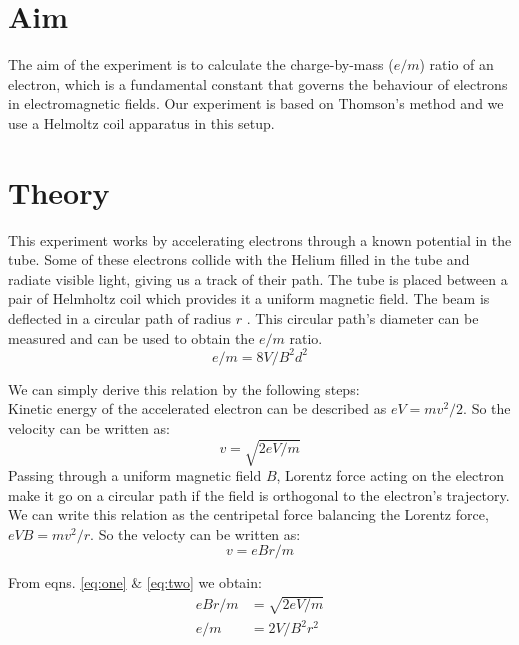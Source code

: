 \documentclass[../main.tex]{subfiles}
\begin{document}
\setcounter{page}{23}

\vspace*{1cm}
\section{Aim}
The aim of the experiment is to calculate the charge-by-mass ($e/m$) ratio of an electron, which is a fundamental constant that governs the behaviour of electrons in electromagnetic fields. Our experiment is based on Thomson's method and we use a Helmoltz coil apparatus in this setup.

\section{Theory}
This experiment works by accelerating electrons through a known potential in the tube. Some of these electrons collide with the Helium filled in the tube and radiate visible light, giving us a track of their path. The tube is placed between a pair of Helmholtz coil which provides it a uniform magnetic field. The beam is deflected in a circular path of radius $r$ . This circular path's diameter can be measured and can be used to obtain the $e/m$ ratio.
$$ e/m = 8V/B^2d^2 $$

We can simply derive this relation by the following steps: \\
Kinetic energy of the accelerated electron can be described as $eV = mv^2/2$. So the velocity can be written as:
\begin{equation}
	v = \sqrt{2eV/m}
	\label{eq:one}
\end{equation}
Passing through a uniform magnetic field $B$, Lorentz force acting on the electron make it go on a circular path if the field is orthogonal to the electron's trajectory. We can write this relation as the centripetal force balancing the Lorentz force, $eVB = mv^2/r$. So the velocty can be written as:
\begin{equation}
	v = eBr/m
	\label{eq:two}
\end{equation}

From eqns. \autoref{eq:one} \& \autoref{eq:two} we obtain:
\begin{align}
	eBr/m &= \sqrt{2eV/m} \\
	e/m &= 2V/B^2r^2
\end{align}
\end{document}
